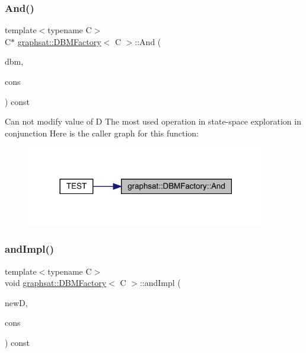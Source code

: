 \subsubsection{\texorpdfstring{And()}{And()}}
{\footnotesize\ttfamily template$<$typename C$>$ \\
C$\ast$ \mbox{\hyperlink{classgraphsat_1_1_d_b_m_factory}{graphsat\+::\+D\+B\+M\+Factory}}$<$ C $>$\+::And (\begin{DoxyParamCaption}\item[{const C $\ast$const}]{dbm,  }\item[{const \mbox{\hyperlink{classgraphsat_1_1_clock_constraint}{Clock\+Constraint}}$<$ C $>$ \&}]{cons }\end{DoxyParamCaption}) const\hspace{0.3cm}{\ttfamily [inline]}}

Can not modify value of D The most used operation in state-\/space exploration in conjunction Here is the caller graph for this function\+:
\nopagebreak
\begin{figure}[H]
\begin{center}
\leavevmode
\includegraphics[width=297pt]{classgraphsat_1_1_d_b_m_factory_af2ab13a24914e31d8fc85f2d96fc38b2_icgraph}
\end{center}
\end{figure}
\mbox{\label{classgraphsat_1_1_d_b_m_factory_aa0ecf76e4c8f3de3a60ef3642e417dc1}} 
\subsubsection{\texorpdfstring{andImpl()}{andImpl()}}
{\footnotesize\ttfamily template$<$typename C$>$ \\
void \mbox{\hyperlink{classgraphsat_1_1_d_b_m_factory}{graphsat\+::\+D\+B\+M\+Factory}}$<$ C $>$\+::and\+Impl (\begin{DoxyParamCaption}\item[{C $\ast$}]{newD,  }\item[{const \mbox{\hyperlink{classgraphsat_1_1_clock_constraint}{Clock\+Constraint}}$<$ C $>$ \&}]{cons }\end{DoxyParamCaption}) const\hspace{0.3cm}{\ttfamily [inline]}}

